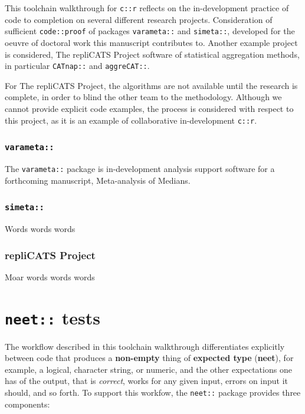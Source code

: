\documentclass[
]{article}
\begin{document}
This toolchain walkthrough for \texttt{c::r} reflects on the in-development practice of code to completion on several different research projects. Consideration of sufficient \texttt{code::proof} of packages \texttt{varameta::} and \texttt{simeta::}, developed for the oeuvre of doctoral work this manuscript contributes to. Another example project is considered, The repliCATS Project software of statistical aggregation methods, in particular \texttt{CATnap::} and \texttt{aggreCAT::}.

For The repliCATS Project, the algorithms are not available until the research is complete, in order to blind the other team to the methodology. Although we cannot provide explicit code examples, the process is considered with respect to this project, as it is an example of collaborative in-development \texttt{c::r}.

\hypertarget{varameta}{%
\subsubsection{\texorpdfstring{\texttt{varameta::}}{varameta::}}\label{varameta}}

The \texttt{varameta::} package is in-development analysis support software for a forthcoming manuscript, Meta-analysis of Medians.

\hypertarget{simeta}{%
\subsubsection{\texorpdfstring{\texttt{simeta::}}{simeta::}}\label{simeta}}

Words words words

\hypertarget{replicats-project}{%
\subsubsection{repliCATS Project}\label{replicats-project}}

Moar words words words

\hypertarget{neet-tests}{%
\section{\texorpdfstring{\texttt{neet::} tests}{neet:: tests}}\label{neet-tests}}

The workflow described in this toolchain walkthrough differentiates explicitly between code that produces a \textbf{non-empty} thing of \textbf{expected type} (\textbf{neet}), for example, a logical, character string, or numeric, and the other expectations one has of the output, that is \emph{correct}, works for any given input, errors on input it should, and so forth. To support this workfow, the \texttt{neet::} package provides three components:
\end{document}
